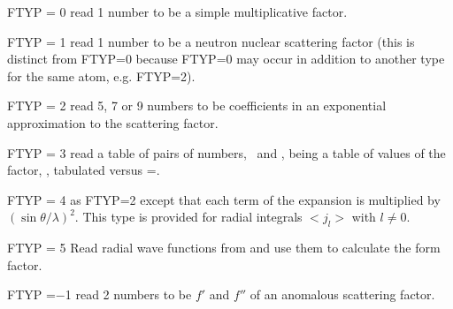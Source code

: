 \cardend\newpage
{}
%
\begin{list} {} {\setlength{\labelwidth}{2.5 cm}
  \setlength{\parsep}{-1ex}
  \setlength{\leftmargin}{\labelwidth}
 \addtolength{\leftmargin}{1 cm}}
\item[FTYP = 0 \hfill] read 1 number to be a simple multiplicative factor.
\item[FTYP = 1 \hfill] read 1 number to be a neutron nuclear scattering factor
              (this is distinct from FTYP=0 because FTYP=0 may occur
               in addition to another type for the same atom, e.g. FTYP=2).
\item[FTYP = 2 \hfill] read 5, 7 or 9 numbers to be coefficients in an exponential
              approximation to the scattering factor.
\item[FTYP = 3 \hfill] read a table of pairs of numbers, \ and ,
 being a table of values of the factor, , tabulated versus =\sthl.
\item[FTYP = 4 \hfill] as FTYP=2 except that each term of the expansion is multiplied
by $(\sin\theta/\lambda)^2$. This type is provided for radial integrals $<j_l>$
with $l\ne0$.
\item[FTYP = 5 \hfill] Read radial wave functions from  and use
them to calculate the form factor.
\item[FTYP =$-$1 \hfill] read 2 numbers to be $f'$ and $f''$ of an anomalous scattering
              factor.\end{list}
%
